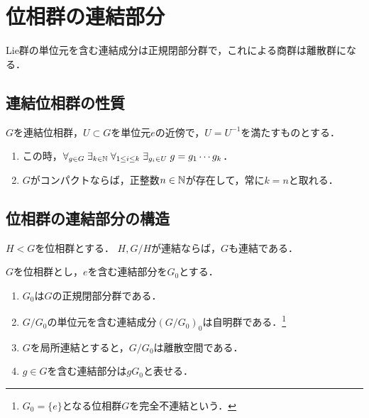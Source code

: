 \documentclass[uplatex,dvipdfmx]{jsreport}
\begin{document}
\section{位相群の連結部分}

\begin{tcolorbox}[colframe=ForestGreen, colback=ForestGreen!10!white,breakable,colbacktitle=ForestGreen!40!white,coltitle=black,fonttitle=\bfseries\sffamily,
title=]
    Lie群の単位元を含む連結成分は正規閉部分群で，これによる商群は離散群になる．
\end{tcolorbox}

\subsection{連結位相群の性質}

\begin{theorem}
    $G$を連結位相群，$U\subset G$を単位元$e$の近傍で，$U=U^{-1}$を満たすものとする．
    \begin{enumerate}
        \item この時，$\forall_{g\in G}\;\exists_{k\in\mathbb{N}}\;\forall_{1\le i\le k}\;\exists_{g_i\in U}\;g=g_1\cdots g_k$．
        \item $G$がコンパクトならば，正整数$n\in\mathbb{N}$が存在して，常に$k=n$と取れる．
    \end{enumerate}
\end{theorem}

\subsection{位相群の連結部分の構造}

\begin{lemma}[連結性の遺伝]
    $H<G$を位相群とする．
    $H,G/H$が連結ならば，$G$も連結である．
\end{lemma}

\begin{theorem}
    $G$を位相群とし，$e$を含む連結部分を$G_0$とする．
    \begin{enumerate}
        \item $G_0$は$G$の正規閉部分群である．
        \item $G/G_0$の単位元を含む連結成分$(G/G_0)_0$は自明群である．\footnote{$G_0=\{e\}$となる位相群$G$を完全不連結という．}
        \item $G$を局所連結とすると，$G/G_0$は離散空間である．
        \item $g\in G$を含む連結部分は$gG_0$と表せる．
    \end{enumerate}
\end{theorem}
\end{document}
